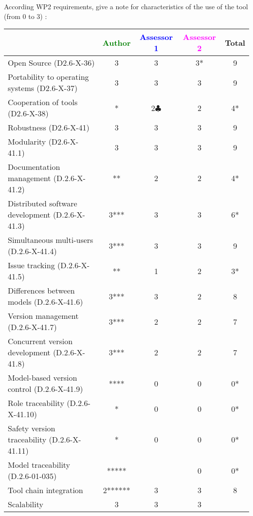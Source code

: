 According WP2 requirements, give a note for characteristics of the use of the tool (from 0 to 3) :

\begin{tabular}{|l | c | c | c | c|}
\hline
& \textcolor{green}{Author} & \textcolor{blue}{Assessor 1} & \textcolor{magenta}{Assessor 2} & Total \\
\hline
Open Source (D2.6-X-36) &3 &3 &3* & 9 \\
\hline
Portability to operating systems (D2.6-X-37) &3 &3 &3 & 9 \\
\hline
Cooperation of tools (D2.6-X-38) &* &2$\clubsuit$ &2 & 4* \\
\hline
Robustness (D2.6-X-41) &3 &3 &3 & 9 \\
\hline
Modularity (D2.6-X-41.1) &3 &3 &3 & 9 \\
\hline
Documentation management (D.2.6-X-41.2) &** &2 &2 & 4* \\
\hline
Distributed software development (D.2.6-X-41.3) &3*** &3 &3 & 6* \\
\hline
Simultaneous multi-users (D.2.6-X-41.4) &3*** & 3&3 & 9 \\
\hline
Issue tracking (D.2.6-X-41.5) &** &1 &2 & 3* \\
\hline
Differences between models (D.2.6-X-41.6) &3*** &3 &2 & 8 \\
\hline
Version management (D.2.6-X-41.7) &3*** &2 &2 & 7 \\
\hline
Concurrent version development (D.2.6-X-41.8) &3*** &2 &2 & 7 \\
\hline
Model-based version control (D.2.6-X-41.9) &**** &0 &0 & 0* \\
\hline
Role traceability (D.2.6-X-41.10) &* &0 &0 & 0* \\
\hline
Safety version traceability (D.2.6-X-41.11) &* &0 &0 & 0* \\
\hline
Model traceability (D.2.6-01-035) &***** & &0 & 0* \\
\hline
Tool chain integration &2****** &3 &3 & 8 \\
\hline
Scalability &3 &3 &3 & \\
\hline
\end{tabular}

